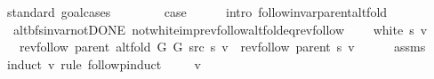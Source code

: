 \begin{isabellebody}
\endisataginvisible
{\isafoldinvisible}%
%
\isadeliminvisible
\isanewline
%
\endisadeliminvisible
%
\isadelimproof
%
\endisadelimproof
%
\isatagproof
{}\isamarkupfalse%
\ {\isacharparenleft}{\kern0pt}standard{\isacharcomma}{\kern0pt}\ goal{\isacharunderscore}{\kern0pt}cases{\isacharparenright}{\kern0pt}\isanewline
\ \ \isamarkupfalse%
\ {}\isanewline
\ \ \isamarkupfalse%
\ {\isacharquery}{\kern0pt}case\isanewline
\ \ \ \ \isamarkupfalse%
\ {\isacharparenleft}{\kern0pt}intro\ follow{\isacharunderscore}{\kern0pt}invar{\isacharunderscore}{\kern0pt}parent{\isacharunderscore}{\kern0pt}alt{\isacharunderscore}{\kern0pt}fold{\isacharparenright}{\kern0pt}\isanewline
{}\isamarkupfalse%
%
\endisatagproof
{\isafoldproof}%
%
\isadelimproof
\isanewline
%
\endisadelimproof
%
\isadeliminvisible
\isanewline
%
\endisadeliminvisible
%
\isataginvisible
{}\isamarkupfalse%
\ {\isacharparenleft}{\kern0pt}\ alt{\isacharunderscore}{\kern0pt}bfs{\isacharunderscore}{\kern0pt}invar{\isacharunderscore}{\kern0pt}not{\isacharunderscore}{\kern0pt}DONE{\isacharparenright}{\kern0pt}\ not{\isacharunderscore}{\kern0pt}white{\isacharunderscore}{\kern0pt}imp{\isacharunderscore}{\kern0pt}rev{\isacharunderscore}{\kern0pt}follow{\isacharunderscore}{\kern0pt}alt{\isacharunderscore}{\kern0pt}fold{\isacharunderscore}{\kern0pt}eq{\isacharunderscore}{\kern0pt}rev{\isacharunderscore}{\kern0pt}follow{\isacharcolon}{\kern0pt}\isanewline
\ \ \ {\isachardoublequoteopen}{\isasymnot}\ white\ s\ v{\isachardoublequoteclose}\isanewline
\ \ \ {\isachardoublequoteopen}rev{\isacharunderscore}{\kern0pt}follow\ {\isacharparenleft}{\kern0pt}parent\ {\isacharparenleft}{\kern0pt}alt{\isacharunderscore}{\kern0pt}fold\ G{}\ G{}\ src\ s{\isacharparenright}{\kern0pt}{\isacharparenright}{\kern0pt}\ v\ {\isacharequal}{\kern0pt}\ rev{\isacharunderscore}{\kern0pt}follow\ {\isacharparenleft}{\kern0pt}parent\ s{\isacharparenright}{\kern0pt}\ v{\isachardoublequoteclose}%
\endisataginvisible
{\isafoldinvisible}%
%
\isadeliminvisible
\isanewline
%
\endisadeliminvisible
%
\isadelimproof
\ \ \ \ %
\endisadelimproof
%
\isatagproof
{}\isamarkupfalse%
\ assms\isanewline
{}\isamarkupfalse%
\ {\isacharparenleft}{\kern0pt}induct\ v\ rule{\isacharcolon}{\kern0pt}\ follow{\isacharunderscore}{\kern0pt}pinduct{\isacharparenright}{\kern0pt}\isanewline
\ \ \isamarkupfalse%
\ {\isacharparenleft}{\kern0pt}{}\ v{\isacharparenright}{\kern0pt}\isanewline

\end{isabellebody}
